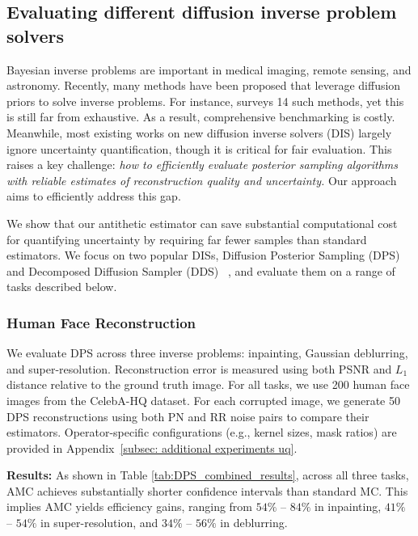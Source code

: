\documentclass[12pt]{article}
\newcommand{\0}{\mathbf{0}}
\begin{document}
\subsection{Evaluating different diffusion inverse problem solvers}\label{subsec:evaluation inverse solver}

Bayesian inverse problems are important in medical imaging, remote sensing, and astronomy. Recently, many methods have been proposed that leverage diffusion priors to solve inverse problems. For instance, \citet{zheng2025inversebench} surveys 14 such methods, yet this is still far from exhaustive. As a result, comprehensive benchmarking is costly. Meanwhile, most existing works on new diffusion inverse solvers (DIS) largely ignore uncertainty quantification, though it is critical for fair evaluation.
This raises a key challenge: \textit{how to efficiently evaluate posterior sampling algorithms with reliable estimates of reconstruction quality and uncertainty.} Our approach aims to efficiently address this gap.


We show that our antithetic estimator can save substantial computational cost for quantifying uncertainty by requiring far fewer samples than standard estimators. We focus on two popular DISs, Diffusion Posterior Sampling (DPS) ~\citep{chung2023diffusion} and Decomposed Diffusion Sampler (DDS) ~\citep{chung2023decomposed}, and evaluate them on a range of tasks described below.



\subsubsection{Human Face Reconstruction}

We evaluate DPS across three inverse problems: inpainting, Gaussian deblurring, and super-resolution. Reconstruction error is measured using both PSNR and $L_1$ distance relative to the ground truth image. For all tasks, we use 200 human face images from the CelebA-HQ dataset. For each corrupted image, we generate 50 DPS reconstructions using both PN and RR noise pairs to compare their estimators. Operator-specific configurations (e.g., kernel sizes, mask ratios) are provided in Appendix~\ref{subsec: additional experiments uq}. 

\textbf{Results:} 
As shown in Table \ref{tab:DPS_combined_results}, across all three tasks, AMC achieves substantially shorter confidence intervals than standard MC. This implies AMC yields efficiency gains, ranging from $54\%$ – $84\%$ in inpainting, $41\%$ – $54\%$ in super-resolution, and $34\%$ – $56\%$ in deblurring.
\end{document}
